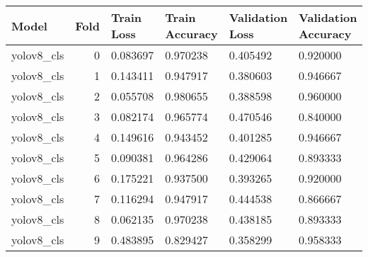 \begin{tabular}{|l|r|l|l|l|l|}
\toprule \hline
Model & Fold & Train Loss & Train Accuracy & Validation Loss & Validation Accuracy \\ \hline
\midrule
yolov8\_cls & 0 & 0.083697 & 0.970238 & 0.405492 & 0.920000 \\ \hline
yolov8\_cls & 1 & 0.143411 & 0.947917 & 0.380603 & 0.946667 \\ \hline
yolov8\_cls & 2 & 0.055708 & 0.980655 & 0.388598 & 0.960000 \\ \hline
yolov8\_cls & 3 & 0.082174 & 0.965774 & 0.470546 & 0.840000 \\ \hline
yolov8\_cls & 4 & 0.149616 & 0.943452 & 0.401285 & 0.946667 \\ \hline
yolov8\_cls & 5 & 0.090381 & 0.964286 & 0.429064 & 0.893333 \\ \hline
yolov8\_cls & 6 & 0.175221 & 0.937500 & 0.393265 & 0.920000 \\ \hline
yolov8\_cls & 7 & 0.116294 & 0.947917 & 0.444538 & 0.866667 \\ \hline
yolov8\_cls & 8 & 0.062135 & 0.970238 & 0.438185 & 0.893333 \\ \hline
yolov8\_cls & 9 & 0.483895 & 0.829427 & 0.358299 & 0.958333 \\ \hline
\bottomrule
\end{tabular}

